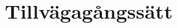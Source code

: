 \documentclass[swedish, a4paper,12pt]{article}
\begin{document}





\section{Tillvägagångssätt}


\end{document}
